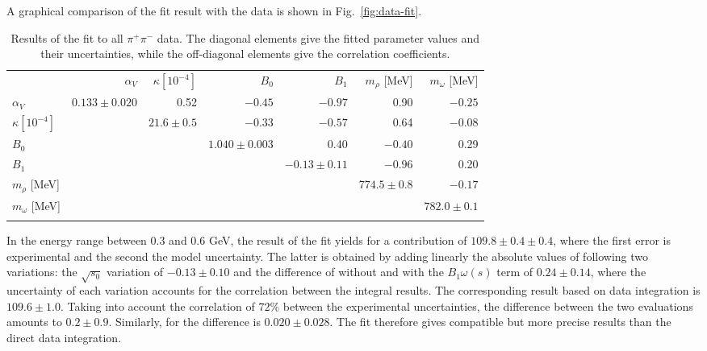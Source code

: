 A graphical comparison of the fit result with the data is shown in Fig.~\ref{fig:data-fit}.
\begin{table}[tbh]
\setlength{\tabcolsep}{0.0pc}
\begin{tabularx}{\textwidth}{@{\extracolsep{\fill}}lrrrrrr} 
\hline\noalign{\smallskip}
 & $\alpha_V$ & $\kappa [10^{-4}]$ & $B_0$ & $B_1$ & $m_\rho$ [MeV] & $m_\omega$ [MeV] \\
\noalign{\smallskip}\hline\noalign{\smallskip}
$\alpha_V$ & $0.133\pm 0.020$ & 0.52 & $-0.45$ & $-0.97$ & 0.90 & $-0.25$ \\
$\kappa [10^{-4}]$ & & $21.6\pm 0.5$ & $-0.33$ & $-0.57$ & 0.64 & $-0.08$ \\
$B_0$ & & & $1.040\pm 0.003$ & 0.40 & $-0.40$ & 0.29 \\
$B_1$ & & & & $-0.13\pm 0.11$ & $-0.96$ & 0.20 \\
$m_\rho$ [MeV] & & & & & $774.5\pm 0.8$ & $-0.17$ \\
$m_\omega$ [MeV] & & & & & & $782.0\pm 0.1$ \\
\noalign{\smallskip}\hline
\end{tabularx}
    \caption{Results of the fit to all $\pi^+\pi^-$ data. The diagonal elements give the fitted parameter values and their uncertainties, while the off-diagonal elements give the correlation coefficients.}
    \label{tab:fit}
\end{table}
In the energy range between 0.3 and 0.6 GeV, the result of the fit yields for \amuhadLOpp a contribution of $109.8 \pm 0.4\pm 0.4$, where the first error is experimental and the second the model uncertainty. The latter is obtained by adding linearly the absolute values of following two variations: the $\sqrt{s_0}$ variation of $-0.13\pm 0.10$ and the difference of without and with the $B_1\omega(s)$ term of $0.24\pm 0.14$, where the uncertainty of each variation accounts for the correlation between the integral results. The corresponding result based on data integration is $109.6 \pm 1.0$. Taking into account the correlation of $72\%$ between the  experimental uncertainties, the difference between the two evaluations amounts to $0.2 \pm 0.9$. Similarly, for \dahadZ the difference is $0.020 \pm 0.028$. The fit therefore gives compatible but more precise results than the direct data integration.

